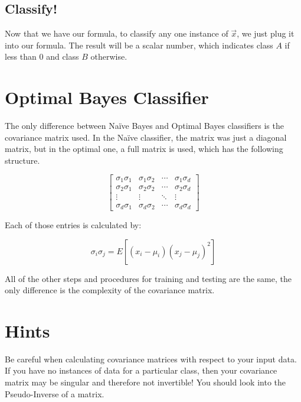 \documentclass{article}
\begin{document}
\subsection{Classify!}

Now that we have our formula, to classify any one instance of
$\vec{x}$, we just plug it into our formula.  The result will be a
scalar number, which indicates class $A$ if less than $0$ and class
$B$ otherwise.



\section{Optimal Bayes Classifier}
\label{sec:obayes}

The only difference between Na\"ive Bayes and Optimal Bayes classifiers
is the covariance matrix used.  In the Na\"ive classifier, the matrix
was just a diagonal matrix, but in the optimal one, a full matrix is
used, which has the following structure.

\begin{displaymath}
\begin{bmatrix} \sigma_1\sigma_1 & \sigma_1\sigma_2 & \cdots & \sigma_1\sigma_d \\
				 \sigma_2\sigma_1 & \sigma_2\sigma_2 & \cdots & \sigma_2\sigma_d \\
				 \vdots & \vdots & \ddots & \vdots \\
				 \sigma_d\sigma_1 & \sigma_d\sigma_2 & \cdots & \sigma_d\sigma_d
\end{bmatrix}
\end{displaymath}

Each of those entries is calculated by:

\begin{displaymath}
 \sigma_i\sigma_j = E [{(x_i - \mu_i)(x_j - \mu_j)}^2]
\end{displaymath}

All of the other steps and procedures for training and testing are the
same, the only difference is the complexity of the covariance matrix.


\section{Hints}
\label{sec:hints}

Be careful when calculating covariance matrices with respect to your
input data. If you have no instances of data for a particular class,
then your covariance matrix may be singular and therefore not
invertible!  You should look into the Pseudo-Inverse of a
matrix. \cite{wiki_pinv}


\end{document}
